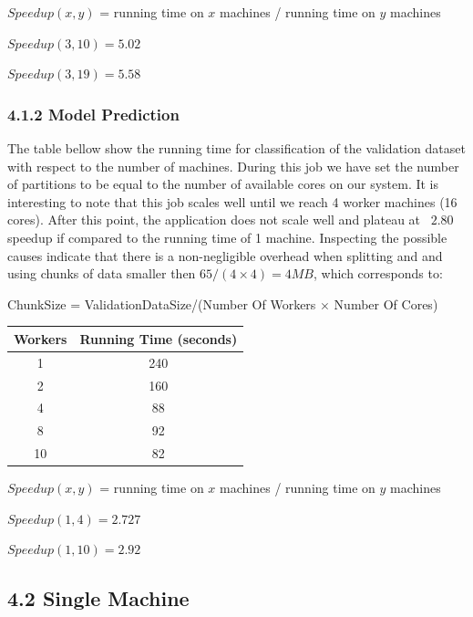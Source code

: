 \documentclass{neu_handout}
\begin{document}
\begin{center}
$Speed up(x,y)$ = running time on $x$ machines / running time on $y$ machines

$Speed up(3,10) = 5.02$

$Speed up(3,19) = 5.58$
\end{center}

\subsubsection*{4.1.2 Model Prediction}

The table bellow show the running time for classification of the validation dataset with respect to the number of machines. During this job we have set the number of partitions to be equal to the number of available cores on our system. It is interesting to note that this job scales well until we reach 4 worker machines (16 cores). After this point, the application does not scale well and plateau at ~$2.80$ speedup if compared to the running time of 1 machine. Inspecting the possible causes indicate that there is a non-negligible overhead when splitting and and using chunks of data smaller then $65/(4\times 4)=4MB$, which corresponds to:

\begin{center}
ChunkSize = ValidationDataSize/(Number Of Workers $\times$ Number Of Cores)
\end{center}


\begin{center}
 \begin{tabular}{||c c ||} 
 \hline
Workers & Running Time (seconds) \\ [0.5ex] 
 \hline\hline
 1 & 240  \\ 
 \hline
 2 & 160  \\ 
 \hline
 4 & 88  \\ 
 \hline
 8 & 92  \\ 
 \hline
 10 & 82  \\  [1ex] 
 \hline
\end{tabular}
\end{center}

\begin{center}
$Speed up(x,y)$ = running time on $x$ machines / running time on $y$ machines

$Speed up(1,4) = 2.727$

$Speed up(1,10) = 2.92$
\end{center}


\subsection*{4.2 Single Machine}
\end{document}
